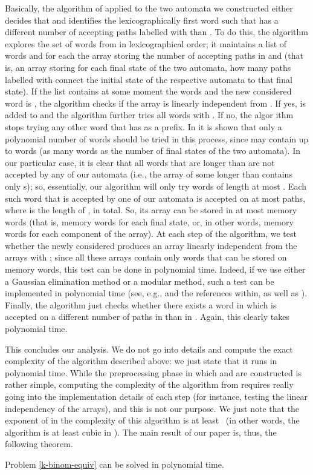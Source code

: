 \documentclass[runningheads]{llncs}
\begin{document}
Basically, the algorithm of \cite{siamNFA} applied to the two automata we constructed either decides that  and  identifies the lexicographically first word  such that  has a different number of accepting paths labelled with  than . To do this, the algorithm explores the set of words from  in lexicographical order; it maintains a list of words  and for each  the array  storing the number of accepting paths in  and  (that is, an array storing for each final state of the two automata, how many paths labelled with  connect the initial state of the respective automata to that final state). If the list  contains at some moment the words  and the new considered word is , the algorithm checks if the array  is linearly independent from . If yes,  is added to  and the algorithm further tries all words  with . If no, the algor
 ithm stops trying any other word that has  as a prefix. In \cite{siamNFA} it is shown that only a polynomial number of words should be tried in this process, since  may contain up to  words (as many words as the number of final states of the two automata). In our particular case, it is clear that all words that are longer than  are not accepted by any of our automata (i.e., the array  of some  longer than  contains only s); so, essentially, our algorithm will only try words of length at most . Each such word  that is accepted by one of our automata is accepted on at most  paths, where  is the length of , in total. So, its array  can be stored in at most  memory words (that is,  memory words for each final state, or, in other words,  memory words for each component of the array). At each step of the algorithm, we test whether the newly considered  produces an array  linearly independent from
  the arrays  with ; since all these arrays contain only words that can be stored on  memory words, this test can be done in polynomial time. Indeed, if we use either  a Gaussian elimination method or a modular method, such a test can be implemented in polynomial time (see, e.g., \cite{mulders} and the references within, as well as \cite{Gathen}). Finally, the algorithm just checks whether there exists a word  in  which is accepted on a different number of paths in  than in . Again, this clearly takes polynomial time. 

This concludes our analysis. We do not go into details and compute the exact complexity of the algorithm described above: we just state that it runs in polynomial time. While the preprocessing phase in which  and  are constructed is rather simple, computing the complexity of the algorithm from \cite{siamNFA} requires really going into the implementation details of each step (for instance, testing the linear independency of the arrays), and this is not our purpose. We just note that the exponent of  in the complexity of this algorithm is at least~ (in other words, the algorithm is at least cubic in ). The main result of our paper is, thus, the following theorem. 
\begin{theorem}Problem \ref{k-binom-equiv} can be solved in polynomial time.
\end{theorem}
\end{document}
